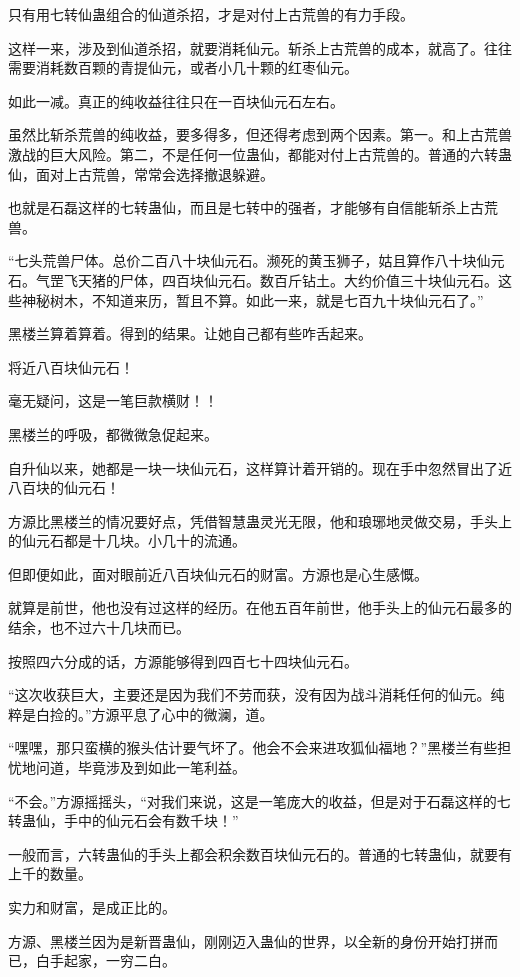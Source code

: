 \begin{this_body}
只有用七转仙蛊组合的仙道杀招，才是对付上古荒兽的有力手段。

这样一来，涉及到仙道杀招，就要消耗仙元。斩杀上古荒兽的成本，就高了。往往需要消耗数百颗的青提仙元，或者小几十颗的红枣仙元。

如此一减。真正的纯收益往往只在一百块仙元石左右。

虽然比斩杀荒兽的纯收益，要多得多，但还得考虑到两个因素。第一。和上古荒兽激战的巨大风险。第二，不是任何一位蛊仙，都能对付上古荒兽的。普通的六转蛊仙，面对上古荒兽，常常会选择撤退躲避。

也就是石磊这样的七转蛊仙，而且是七转中的强者，才能够有自信能斩杀上古荒兽。

“七头荒兽尸体。总价二百八十块仙元石。濒死的黄玉狮子，姑且算作八十块仙元石。气罡飞天猪的尸体，四百块仙元石。数百斤钻土。大约价值三十块仙元石。这些神秘树木，不知道来历，暂且不算。如此一来，就是七百九十块仙元石了。”

黑楼兰算着算着。得到的结果。让她自己都有些咋舌起来。

将近八百块仙元石！

毫无疑问，这是一笔巨款横财！！

黑楼兰的呼吸，都微微急促起来。

自升仙以来，她都是一块一块仙元石，这样算计着开销的。现在手中忽然冒出了近八百块的仙元石！

方源比黑楼兰的情况要好点，凭借智慧蛊灵光无限，他和琅琊地灵做交易，手头上的仙元石都是十几块。小几十的流通。

但即便如此，面对眼前近八百块仙元石的财富。方源也是心生感慨。

就算是前世，他也没有过这样的经历。在他五百年前世，他手头上的仙元石最多的结余，也不过六十几块而已。

按照四六分成的话，方源能够得到四百七十四块仙元石。

“这次收获巨大，主要还是因为我们不劳而获，没有因为战斗消耗任何的仙元。纯粹是白捡的。”方源平息了心中的微澜，道。

“嘿嘿，那只蛮横的猴头估计要气坏了。他会不会来进攻狐仙福地？”黑楼兰有些担忧地问道，毕竟涉及到如此一笔利益。

“不会。”方源摇摇头，“对我们来说，这是一笔庞大的收益，但是对于石磊这样的七转蛊仙，手中的仙元石会有数千块！”

一般而言，六转蛊仙的手头上都会积余数百块仙元石的。普通的七转蛊仙，就要有上千的数量。

实力和财富，是成正比的。

方源、黑楼兰因为是新晋蛊仙，刚刚迈入蛊仙的世界，以全新的身份开始打拼而已，白手起家，一穷二白。


\end{this_body}
